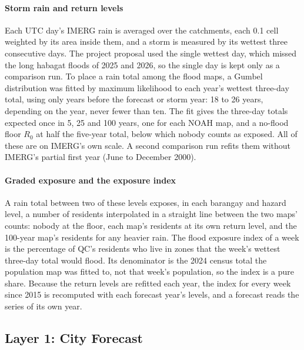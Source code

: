 \paragraph{Storm rain and return levels}
Each UTC day's IMERG rain is averaged over the catchments, each 0.1\textdegree{} cell weighted by
its area inside them, and a storm is measured by its wettest three consecutive days. The project
proposal used the single wettest day, which missed the long habagat floods of 2025 and 2026, so
the single day is kept only as a comparison run. To place a rain total among the flood maps, a
Gumbel distribution was fitted by maximum likelihood \parencite{coles2001,virtanen2020} to each
year's
wettest three-day total, using only years before the forecast or storm year: 18 to 26 years,
depending on the year, never fewer than ten. The fit gives the three-day totals expected once in
5, 25 and 100 years, one for each NOAH map, and a no-flood floor $R_0$ at half the five-year
total, below which nobody counts as exposed. All of these are on IMERG's own scale. A second
comparison run refits them without IMERG's partial first year (June to December 2000).

\paragraph{Graded exposure and the exposure index}
A rain total between two of these levels exposes, in each barangay and hazard level, a number of
residents interpolated in a straight line between the two maps' counts: nobody at the floor, each
map's residents at its own return level, and the 100-year map's residents for any heavier rain.
The flood exposure index of a week is the percentage of QC's residents who live in zones that the
week's wettest three-day total would flood. Its denominator is the 2024 census total the
population map was fitted to, not that week's population, so the index is a pure share. Because
the return levels are refitted each year, the index for every week since 2015 is recomputed with
each forecast year's levels, and a forecast reads the series of its own year.

\subsection{Layer 1: City Forecast}\label{sec:layer1}

